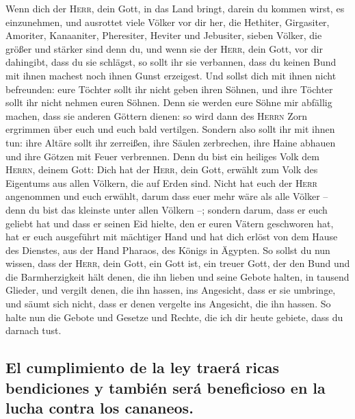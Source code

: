  Wenn dich der \textsc{Herr}, dein Gott, in das Land
bringt, darein du kommen wirst, es einzunehmen, und ausrottet viele
Völker vor dir her, die Hethiter, Girgasiter, Amoriter, Kanaaniter,
Pheresiter, Heviter und Jebusiter, sieben Völker, die größer und stärker
sind denn du,  und wenn sie der \textsc{Herr}, dein Gott,
vor dir dahingibt, dass du sie schlägst, so sollt ihr sie verbannen,
dass du keinen Bund mit ihnen machest noch ihnen Gunst erzeigest.
 Und sollst dich mit ihnen nicht befreunden: eure Töchter
sollt ihr nicht geben ihren Söhnen, und ihre Töchter sollt ihr nicht
nehmen euren Söhnen.  Denn sie werden eure Söhne mir
abfällig machen, dass sie anderen Göttern dienen: so wird dann des
\textsc{Herrn} Zorn ergrimmen über euch und euch bald vertilgen.
 Sondern also sollt ihr mit ihnen tun: ihre Altäre sollt
ihr zerreißen, ihre Säulen zerbrechen, ihre Haine abhauen und ihre
Götzen mit Feuer verbrennen.  Denn du bist ein heiliges
Volk dem \textsc{Herrn}, deinem Gott: Dich hat der \textsc{Herr}, dein
Gott, erwählt zum Volk des Eigentums aus allen Völkern, die auf Erden
sind.  Nicht hat euch der \textsc{Herr} angenommen und
euch erwählt, darum dass euer mehr wäre als alle Völker -- denn du bist
das kleinste unter allen Völkern --;  sondern darum, dass
er euch geliebt hat und dass er seinen Eid hielte, den er euren Vätern
geschworen hat, hat er euch ausgeführt mit mächtiger Hand und hat dich
erlöst von dem Hause des Dienstes, aus der Hand Pharaos, des Königs in
Ägypten.  So sollst du nun wissen, dass der \textsc{Herr},
dein Gott, ein Gott ist, ein treuer Gott, der den Bund und die
Barmherzigkeit hält denen, die ihn lieben und seine Gebote halten, in
tausend Glieder,  und vergilt denen, die ihn hassen, ins
Angesicht, dass er sie umbringe, und säumt sich nicht, dass er denen
vergelte ins Angesicht, die ihn hassen.  So halte nun die
Gebote und Gesetze und Rechte, die ich dir heute gebiete, dass du
darnach tust.

\hypertarget{el-cumplimiento-de-la-ley-traeruxe1-ricas-bendiciones-y-tambiuxe9n-seruxe1-beneficioso-en-la-lucha-contra-los-cananeos.}{%
\subsection{El cumplimiento de la ley traerá ricas bendiciones y también
será beneficioso en la lucha contra los
cananeos.}\label{el-cumplimiento-de-la-ley-traeruxe1-ricas-bendiciones-y-tambiuxe9n-seruxe1-beneficioso-en-la-lucha-contra-los-cananeos.}}

